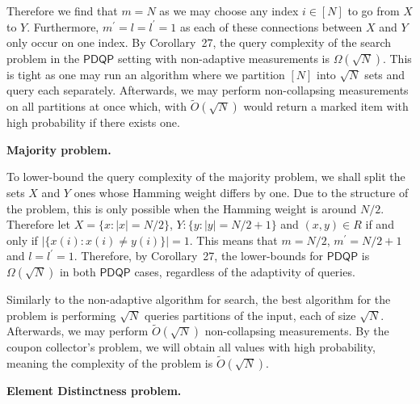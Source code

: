 \documentclass[10pt,a4paper]{article}
\begin{document}
Therefore we find that $m=N$ as we may choose any index $i\in[N]$ to go from $X$ to $Y$. Furthermore, $m^{\prime}=l=l^{\prime}=1$ as each of these connections between $X$ and $Y$ only occur on one index. By Corollary 27, the query complexity of the search problem in the $\mathsf{PDQP}$ setting with non-adaptive measurements is $\Omega(\sqrt{N})$. This is tight as one may run an algorithm where we partition $[N]$ into $\sqrt{N}$ sets and query each separately. Afterwards, we may perform non-collapsing measurements on all partitions at once which, with $\tilde{O}(\sqrt{N})$ would return a marked item with high probability if there exists one.\par





\par\medskip\noindent\textbf{Majority problem.}\par




To lower-bound the query complexity of the majority problem, we shall split the sets $X$ and $Y$ ones whose Hamming weight differs by one. Due to the structure of the problem, this is only possible when the Hamming weight is around $N/2$. Therefore let $X=\{x:|x|=N/2\}$, $Y:\{y:|y|=N/2+1\}$ and $(x,y)\in R$ if and only if $|\{x(i):x(i)\neq y(i)\}|=1$. This means that $m=N/2$, $m^{\prime}=N/2+1$ and $l=l^{\prime}=1$. Therefore, by Corollary 27, the lower-bounds for $\mathsf{PDQP}$ is $\Omega(\sqrt{N})$ in both $\mathsf{PDQP}$ cases, regardless of the adaptivity of queries.\par




Similarly to the non-adaptive algorithm for search, the best algorithm for the problem is performing $\sqrt{N}$ queries partitions of the input, each of size $\sqrt{N}$. Afterwards, we may perform $\tilde{O}(\sqrt{N})$ non-collapsing measurements. By the coupon collector’s problem, we will obtain all values with high probability, meaning the complexity of the problem is $\tilde{O}(\sqrt{N})$.\par





\par\medskip\noindent\textbf{Element Distinctness problem.}\par
\end{document}
